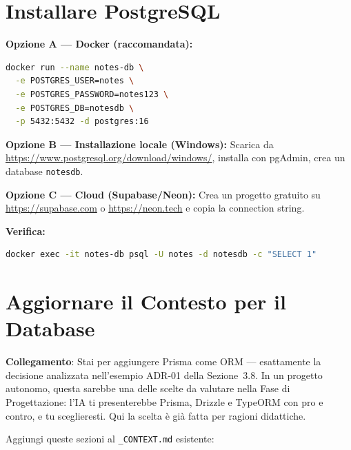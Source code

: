 \section{Installare PostgreSQL}

\begin{praticabox}[title={Pratica --- Setup PostgreSQL}]
\textbf{Opzione A --- Docker (raccomandata):}
\begin{lstlisting}[language=bash]
docker run --name notes-db \
  -e POSTGRES_USER=notes \
  -e POSTGRES_PASSWORD=notes123 \
  -e POSTGRES_DB=notesdb \
  -p 5432:5432 -d postgres:16
\end{lstlisting}

\textbf{Opzione B --- Installazione locale (Windows):}
Scarica da \url{https://www.postgresql.org/download/windows/}, installa con pgAdmin, crea un database \texttt{notesdb}.

\textbf{Opzione C --- Cloud (Supabase/Neon):}
Crea un progetto gratuito su \url{https://supabase.com} o \url{https://neon.tech} e copia la connection string.

\textbf{Verifica:}
\begin{lstlisting}[language=bash]
docker exec -it notes-db psql -U notes -d notesdb -c "SELECT 1"
\end{lstlisting}
\end{praticabox}

\section{Aggiornare il Contesto per il Database}

\begin{notebox}
\textbf{Collegamento}: Stai per aggiungere Prisma come ORM --- esattamente la decisione analizzata nell'esempio ADR-01 della Sezione~3.8. In un progetto autonomo, questa sarebbe una delle scelte da valutare nella Fase di Progettazione: l'IA ti presenterebbe Prisma, Drizzle e TypeORM con pro e contro, e tu sceglieresti. Qui la scelta è già fatta per ragioni didattiche.
\end{notebox}

\begin{praticabox}[title={Pratica --- Aggiorna il \texttt{\_CONTEXT.md}}]
Aggiungi queste sezioni al \texttt{\_CONTEXT.md} esistente:
\end{praticabox}


